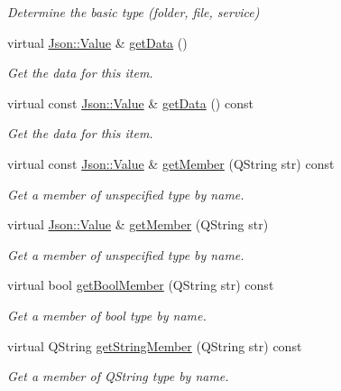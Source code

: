 \begin{DoxyCompactItemize}
\begin{DoxyCompactList}\small\item\em Determine the basic type (folder, file, service) \end{DoxyCompactList}\item 
virtual \hyperlink{class_json_1_1_value}{Json\-::\-Value} \& \hyperlink{class_a_w_e_1_1_media_item_ac3258f4f7f4557205b3906ff15c46612}{get\-Data} ()
\begin{DoxyCompactList}\small\item\em Get the data for this item. \end{DoxyCompactList}\item 
virtual const \hyperlink{class_json_1_1_value}{Json\-::\-Value} \& \hyperlink{class_a_w_e_1_1_media_item_abd79979e34b76f89d6cadabcb7886bd1}{get\-Data} () const 
\begin{DoxyCompactList}\small\item\em Get the data for this item. \end{DoxyCompactList}\item 
virtual const \hyperlink{class_json_1_1_value}{Json\-::\-Value} \& \hyperlink{class_a_w_e_1_1_media_item_a0ac7055ff6dfbe179133f3a9f0aad44b}{get\-Member} (Q\-String str) const 
\begin{DoxyCompactList}\small\item\em Get a member of unspecified type by name. \end{DoxyCompactList}\item 
virtual \hyperlink{class_json_1_1_value}{Json\-::\-Value} \& \hyperlink{class_a_w_e_1_1_media_item_a4be34b9996a67f52c9096ac123b91557}{get\-Member} (Q\-String str)
\begin{DoxyCompactList}\small\item\em Get a member of unspecified type by name. \end{DoxyCompactList}\item 
virtual bool \hyperlink{class_a_w_e_1_1_media_item_ad418457181a157a2a4ca730326d4e135}{get\-Bool\-Member} (Q\-String str) const 
\begin{DoxyCompactList}\small\item\em Get a member of {\ttfamily bool} type by name. \end{DoxyCompactList}\item 
virtual Q\-String \hyperlink{class_a_w_e_1_1_media_item_a9e027085cac3af62a41d6c0a9d74d40b}{get\-String\-Member} (Q\-String str) const 
\begin{DoxyCompactList}\small\item\em Get a member of {\ttfamily Q\-String} type by name. \end{DoxyCompactList}\item 

\end{DoxyCompactItemize}
